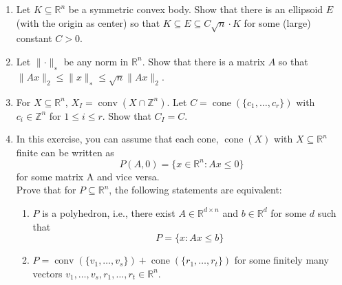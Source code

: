 \documentclass[11pt,a4paper]{article}
\renewcommand{\leq}{\leqslant}
\DeclareMathOperator{\conv}{conv}
\DeclareMathOperator{\cone}{cone}
\begin{document}
\begin{enumerate}
\begin{enumerate}[a)]
 \end{enumerate}
  
\item Let $K ⊆\mathbb{R}^n$ be a symmetric convex body. Show that there is an ellipsoid $E$ (with the origin as center) so that $K ⊆ E ⊆ C\sqrt{n}\cdot K$ for some (large) constant $C >0$.


\item Let $∥\cdot∥_∗$ be any norm in $\mathbb{R}^n$. Show that there is a matrix $A$ so that $∥Ax∥_2 \leq ∥x∥_∗ \leq \sqrt{n}∥Ax∥_2$.
\item For $X⊆\mathbb{R}^n$, $X_I=\conv(X∩\mathbb{Z}^n)$.
Let $C=\cone(\{c_1,\hdots,c_r\})$ with $c_i ∈ \mathbb{Z}^n$ for $1\leq i\leq r$. Show that $C_I =C$.

\item In this exercise, you can assume that each cone, $\cone(X)$ with $X ⊆ \mathbb{R}^n$ finite can be written as $$P(A,0)=\{x∈\mathbb{R}^n: Ax\leq 0\}$$ for some matrix A and vice versa. \\
Prove that for $P ⊆ \mathbb{R}^n$, the following statements are equivalent:
\begin{enumerate}
    \item $P$ is a polyhedron, i.e., there exist $A ∈ \mathbb{R}^{d×n}$ and $b ∈ \mathbb{R}^d$ for some $d$ such that
$$P =\{x:Ax\leq b\}$$
\item $P =\conv(\{v_1,\hdots,v_s\})+\cone(\{r_1,\hdots,r_t\})$ for some finitely many vectors $v_1, \hdots, v_s, r_1, \hdots, r_t \in \mathbb{R}^n$. 
\end{enumerate}

\end{enumerate}


%
%


 
\end{document}
